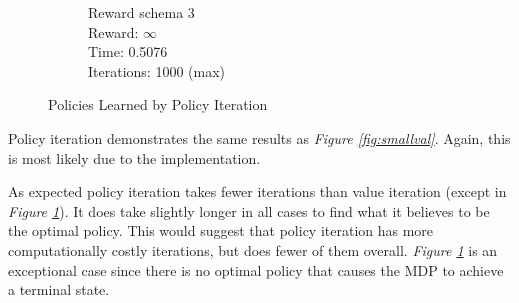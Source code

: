 \documentclass[a4paper,10pt]{article}
\begin{document}
\begin{figure}[H]
\begin{subfigure}[b]{0.3\textwidth}
                \caption{Reward schema 3\\
                Reward: $\infty$ \\
                Time: 0.5076\\
                Iterations: 1000 (max)}
                \label{fig:p3}
        \end{subfigure}
        \caption{Policies Learned by Policy Iteration}\label{fig:animals}
\end{figure}
Policy iteration demonstrates the same results as \textit{Figure \ref{fig:smallval}}. Again, this is most likely due to the implementation.

As expected policy iteration takes fewer iterations than value iteration (except in \textit{Figure \ref{fig:p3}}). It does take slightly longer in all cases to find what it believes to be the optimal policy. This would suggest that policy iteration has more computationally costly iterations, but does fewer of them overall. \textit{Figure \ref{fig:p3}} is an exceptional case since there is no optimal policy that causes the MDP to achieve a terminal state.
\end{document}
